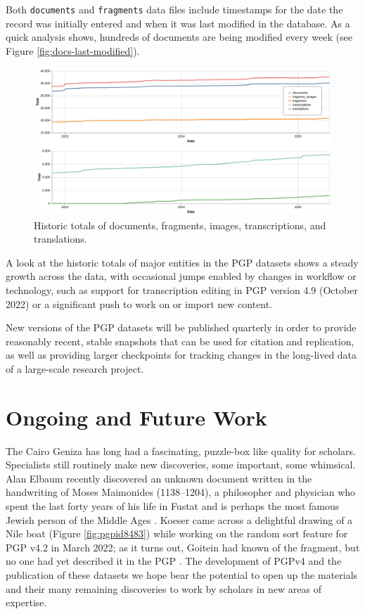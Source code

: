 \documentclass{article}
\begin{document}
Both \texttt{documents} and \texttt{fragments} data files include timestamps for the date the record was initially entered and when it was last modified in the database. As a quick analysis shows, hundreds of documents are being modified every week (see Figure \ref{fig:docs-last-modified}).

\begin{figure}[!hbt]
  \includegraphics[width=\textwidth]{charts/combined_totals_historic.pdf}
  \centering
  \caption{Historic totals of documents, fragments, images, transcriptions, and translations.}
  \label{fig:historic-totals}
\end{figure}

A look at the historic totals of major entities in the PGP datasets shows a steady growth across the data, with occasional jumps enabled by changes in workflow or technology, such as support for transcription editing in PGP version 4.9 (October 2022) or a significant push to work on or import new content.

New versions of the PGP datasets will be published quarterly in order to provide reasonably recent, stable snapshots that can be used for citation and replication, as well as providing larger checkpoints for tracking changes in the long-lived  data of a large-scale research project. 

\section{Ongoing and Future Work}

The Cairo Geniza has long had a fascinating, puzzle-box like quality for scholars. Specialists still routinely make new discoveries, some important, some whimsical. Alan Elbaum recently discovered an unknown document written in the handwriting of Moses Maimonides (1138–1204), a philosopher and physician who spent the last forty years of his life in Fustat and is perhaps the most famous Jewish person of the Middle Ages \autocite{ashur_new_2024, noauthor_list_nodate}. Koeser came across a delightful drawing of a Nile boat (Figure \ref{fig:pgpid8483}) while working on the random sort feature for PGP v4.2 in March 2022; as it turns out, Goitein had known of the fragment, but no one had yet described it in the PGP \autocite{noauthor_paraliterary_nodate}. The development of PGPv4 and the publication of these datasets we hope bear the potential to open up the materials and their many remaining discoveries to work by scholars in new areas of expertise. 
\end{document}
